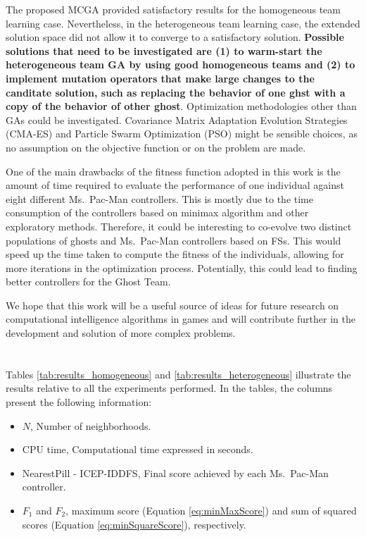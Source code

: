 \documentclass[journal]{IEEEtran}
\begin{document}
The proposed MCGA provided satisfactory results for the homogeneous team learning case. Nevertheless, in the heterogeneous team learning case, the extended solution space did not allow it to converge to a satisfactory solution.\textbf{ Possible solutions that need to be investigated are (1) to warm-start the heterogeneous team GA by using good homogeneous teams and (2) to implement mutation operators that make large changes to the canditate solution, such as replacing the behavior of one ghst with a copy of the behavior of other ghost}.  Optimization methodologies other than GAs could be investigated. Covariance Matrix Adaptation Evolution Strategies (CMA-ES) and Particle Swarm Optimization (PSO) might be sensible choices, as no assumption on the objective function or on the problem are made.

One of the main drawbacks of the fitness function adopted in this work is the amount of time required to evaluate the performance of one individual against eight different Ms.\  Pac-Man controllers. This is mostly due to the time consumption of the controllers based on minimax algorithm and other exploratory methods. Therefore, it could be interesting to co-evolve two distinct populations of ghosts and Ms.\  Pac-Man controllers based on FSs. This would speed up the time taken to compute the fitness of the individuals, allowing for more iterations in the optimization process. Potentially, this could lead to finding better controllers for the Ghost Team.

We hope that this work will be a useful source of ideas for future research on computational intelligence algorithms in games and will contribute further in the development and solution of more complex problems.

\appendices
\section{}
\label{sec:CompleteResults}
Tables \ref{tab:results_homogeneous} and \ref{tab:results_heterogeneous} illustrate the results relative to all the experiments performed. In the tables, the columns present the following information: 

\begin{itemize}
  \item $N$, Number of neighborhoods.
  \item CPU time, Computational time expressed in seconds.
  \item NearestPill - ICEP-IDDFS, Final score achieved by each Ms.\  Pac-Man controller.
  \item $F_1$ and $F_2$, maximum score (Equation \eqref{eq:minMaxScore}) and sum of squared scores (Equation \eqref{eq:minSquareScore}), respectively.
\end{itemize}
\end{document}
